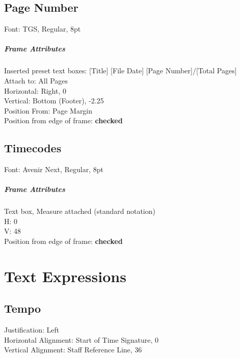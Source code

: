 \documentclass[]{memoir}
\begin{document}
\section{Page Number}
\label{sec:page-number}

Font: TGS, Regular, 8pt

\paragraph{Frame Attributes}
\label{sec:frame-attributes-4}

Inserted preset text boxes: [Title] [File Date] [Page Number]/[Total Pages]\\
Attach to: All Pages\\
Horizontal: Right, 0\\
Vertical: Bottom (Footer), -2.25\\
Position From: Page Margin\\
Position from edge of frame: \textbf{checked}

\section{Timecodes}
\label{sec:timecodes}

Font: Avenir Next, Regular, 8pt

\paragraph{Frame Attributes}
\label{sec:frame-attributes-5}

Text box, Measure attached (standard notation)\\
H: 0\\
V: 48\\
Position from edge of frame: \textbf{checked}

\chapter{Text Expressions}
\label{sec:text-expressions}

\section{Tempo}
\label{sec:tempo}

Justification: Left\\
Horizontal Alignment: Start of Time Signature, 0\\
Vertical Alignment: Staff Reference Line, 36
\end{document}
